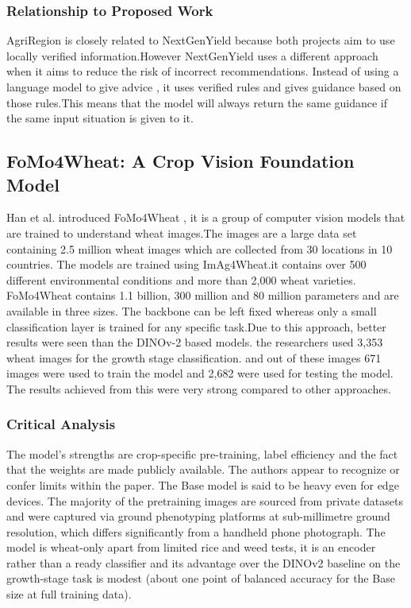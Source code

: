 \documentclass{FastFyp}
\begin{document}
\subsubsection{Relationship to Proposed Work}
AgriRegion is closely related to NextGenYield because both projects aim to use locally verified information.However NextGenYield uses a different approach when it aims to reduce the risk of incorrect recommendations. Instead of using a language model to give advice , it uses verified rules and gives guidance based on those rules.This means that the model will always return the same guidance if the same input situation is given to it.

\subsection{FoMo4Wheat: A Crop Vision Foundation Model}

Han et al. \cite{ref:Han:2025} introduced FoMo4Wheat , it is a group of computer vision models that are trained to understand wheat images.The images are a large data set containing 2.5 million wheat images which are collected from 30 locations in 10 countries. The models are trained using ImAg4Wheat.it contains over 500 different environmental conditions and more than 2,000 wheat varieties. FoMo4Wheat contains 1.1 billion, 300 million and 80 million parameters and are available in three sizes. The backbone can be left fixed whereas only a small classification layer is trained for any specific task.Due to this approach, better results were seen than the DINOv-2 based models. the researchers used 3,353 wheat images for the growth stage classification. and out of these images 671 images were used to train the model and 2,682 were used for testing the model. The results achieved from this were very strong compared to other approaches.

\subsubsection{Critical Analysis}
The model’s strengths are crop-specific pre-training, label efficiency and the fact that the weights are made publicly available. The authors appear to recognize or confer limits within the paper. The Base model is said to be heavy even for edge devices. The majority of the pretraining images are sourced from private datasets and were captured via ground phenotyping platforms at sub-millimetre ground resolution, which differs significantly from a handheld phone photograph. The model is wheat-only apart from limited rice and weed tests, it is an encoder rather than a ready classifier and its advantage over the DINOv2 baseline on the growth-stage task is modest (about one point of balanced accuracy for the Base size at full training data).
\end{document}
